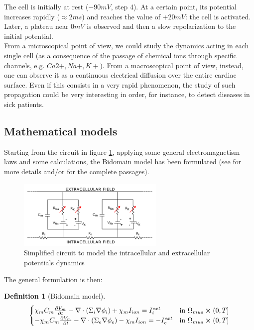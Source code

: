 \documentclass[a4paper,11pt]{article}
\newtheorem{definition}{Definition}
\begin{document}
    \noindent The cell is initially at rest ($-90mV$, step 4). At a certain point, its potential increases rapidly ($\approx2ms$) and reaches the value of $+20mV$: the cell is activated. Later, a plateau near $0mV$ is observed and then a slow repolarization to the initial potential. \\
    From a microscopical point of view, we could study the dynamics acting in each single cell (as a consequence of the passage of chemical ions through specific channels, e.g. $Ca2+,Na+,K+$). From a macroscopical point of view, instead, one can observe it as a continuous electrical diffusion over the entire cardiac surface. Even if this consists in a very rapid phenomenon, the study of such propagation could be very interesting in order, for instance, to detect diseases in sick patients.
    
    \subsection{Mathematical models}
    Starting from the circuit in figure \ref{electrical_circuit}, applying some general electromagnetism laws and some calculations, the Bidomain model has been formulated (see \parencite{acta} for more details and/or \parencite{colli_franzone} for the complete passages).
    
    \begin{figure}[h]
    	\begin{center}
    		\includegraphics[width = 7cm]{./electrical_circuit.png}
    		\caption{Simplified circuit to model the intracellular and extracellular potentials dynamics}
    		\label{electrical_circuit}
    	\end{center}
    \end{figure}
    
    \noindent The general formulation is then: \vspace{3mm}
    \begin{definition}[Bidomain model]
	\begin{equation*}
	\begin{cases}
	\chi_m C_m\pdv{V_m}{t} - \nabla \cdot (\Sigma_i \nabla \phi_i) + \chi_m I_{ion} = I_i^{ext}    & \text{in } \Omega_{mus} \cross (0,T]
	\\
	-\chi_m C_m\pdv{V_m}{t} - \nabla \cdot (\Sigma_e \nabla \phi_e) - \chi_m I_{ion} = -I_e^{ext}    & \text{in } \Omega_{mus} \cross (0,T]
	\end{cases}
	\end{equation*}
    \end{definition}
	\vspace{3mm}
	
\end{document}
